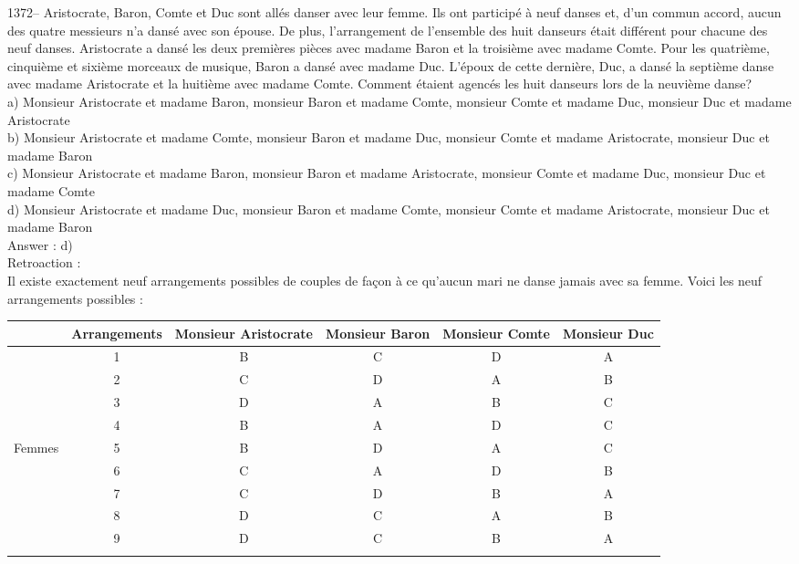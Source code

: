 ﻿\documentclass[letterpaper, 12pt]{article}
\begin{document}
1372-- Aristocrate, Baron, Comte et Duc sont all\'es danser avec
leur femme. Ils ont particip\'e \`a neuf danses et, d'un commun
accord, aucun des quatre messieurs n'a dans\'e avec son \'epouse. De
plus, l'arrangement de l'ensemble des huit danseurs \'etait
diff\'erent pour chacune des neuf danses. Aristocrate a dans\'e les
deux premi\`eres pi\`eces avec madame Baron et la troisi\`eme avec
madame Comte. Pour les quatri\`eme, cinqui\`eme et sixi\`eme
morceaux de musique, Baron a dans\'e avec madame Duc.  L'\'epoux de
cette derni\`ere, Duc, a dans\'e la septi\`eme danse avec madame
Aristocrate et la huiti\`eme avec madame Comte.
Comment \'etaient agenc\'es les huit danseurs lors de la neuvi\`eme danse?\\
a) Monsieur Aristocrate et madame Baron, monsieur Baron et madame Comte,
monsieur Comte et madame Duc, monsieur Duc et madame Aristocrate\\
b) Monsieur Aristocrate et madame Comte, monsieur Baron et madame Duc,
monsieur Comte et madame Aristocrate, monsieur Duc et madame Baron\\
c) Monsieur Aristocrate et madame Baron, monsieur Baron et madame
Aristocrate, monsieur Comte et madame Duc, monsieur Duc et madame Comte\\
d) Monsieur Aristocrate et madame Duc, monsieur Baron et madame Comte,
monsieur Comte et madame Aristocrate, monsieur Duc et madame Baron\\

Answer : d)\\

Retroaction : \\
Il existe exactement neuf arrangements possibles de couples de fa\c con \`a
ce qu'aucun mari ne danse jamais avec sa femme.  Voici les neuf arrangements
possibles :  \\
\begin{tabular}{|c|c|c|c|c|c|}
\hline
        &  Arrangements   & Monsieur Aristocrate & Monsieur Baron & Monsieur
Comte & Monsieur Duc    \\ \hline \hline
        &   1             & B           & C     & D      & A      \\
\cline{2-6}
        &   2             & C           & D     & A      & B      \\
\cline{2-6}
        &   3             & D           & A     & B      & C      \\
\cline{2-6}
        &   4             & B           & A     & D      & C      \\
\cline{2-6}
Femmes  &   5             & B           & D     & A      & C      \\
\cline{2-6}
        &   6             & C           & A     & D      & B      \\
\cline{2-6}
        &   7             & C           & D     & B      & A      \\
\cline{2-6}
        &   8             & D           & C     & A      & B      \\
\cline{2-6}
        &   9             & D           & C     & B      & A      \\ \hline
\multicolumn{6}{c}{}\\
\end{tabular}\\
\end{document}
